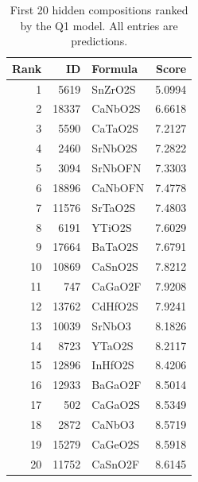 \begin{table}[htbp]\centering\small\caption{First 20 hidden compositions ranked by the Q1 model. All entries are predictions.}\begin{tabular}{rrlr}\toprule Rank & ID & Formula & Score\\\midrule
1 & 5619 & SnZrO2S & 5.0994\\
2 & 18337 & CaNbO2S & 6.6618\\
3 & 5590 & CaTaO2S & 7.2127\\
4 & 2460 & SrNbO2S & 7.2822\\
5 & 3094 & SrNbOFN & 7.3303\\
6 & 18896 & CaNbOFN & 7.4778\\
7 & 11576 & SrTaO2S & 7.4803\\
8 & 6191 & YTiO2S & 7.6029\\
9 & 17664 & BaTaO2S & 7.6791\\
10 & 10869 & CaSnO2S & 7.8212\\
11 & 747 & CaGaO2F & 7.9208\\
12 & 13762 & CdHfO2S & 7.9241\\
13 & 10039 & SrNbO3 & 8.1826\\
14 & 8723 & YTaO2S & 8.2117\\
15 & 12896 & InHfO2S & 8.4206\\
16 & 12933 & BaGaO2F & 8.5014\\
17 & 502 & CaGaO2S & 8.5349\\
18 & 2872 & CaNbO3 & 8.5719\\
19 & 15279 & CaGeO2S & 8.5918\\
20 & 11752 & CaSnO2F & 8.6145\\
\bottomrule\end{tabular}\end{table}
